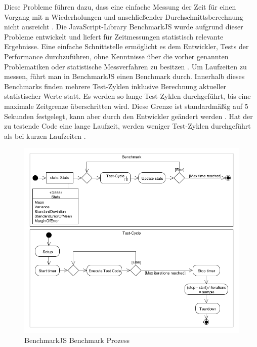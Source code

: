 Diese Probleme führen dazu, dass eine einfache Messung der Zeit für einen Vorgang mit n Wiederholungen und anschließender Durchschnittsberechnung nicht ausreicht \cite{BulletproofJavaScriptBenchmarks}\cite{JSBenchmarkQuality}. Die JavaScript-Library BenchmarkJS wurde aufgrund dieser Probleme entwickelt und liefert für Zeitmessungen statistisch relevante Ergebnisse. Eine einfache Schnittstelle ermöglicht es dem Entwickler, Tests der Performance durchzuführen, ohne Kenntnisse über die vorher genannten Problematiken oder statistische Messverfahren zu besitzen \cite{BenchmarkJS}. Um Laufzeiten zu messen, führt man in BenchmarkJS einen Benchmark durch. Innerhalb dieses Benchmarks finden mehrere Test-Zyklen inklusive Berechnung aktueller statistischer Werte statt. Es werden so lange Test-Zyklen durchgeführt, bis eine maximale Zeitgrenze überschritten wird. Diese Grenze ist standardmäßig auf 5 Sekunden festgelegt, kann aber durch den Entwickler geändert werden \cite{BenchmarkJSDocs}. Hat der zu testende Code eine lange Laufzeit, werden weniger Test-Zyklen durchgeführt als bei kurzen Laufzeiten \cite{BenchmarkJSQuelltext}.
\begin{figure}[h]
	\centering
	\includegraphics[scale=0.5]{Bilder/BenchmarkJS.png}
	\caption{BenchmarkJS Benchmark Prozess\cite{BenchmarkJSHowItWorks}}
	\label{bmjs-benchmark-prozess}
\end{figure}

